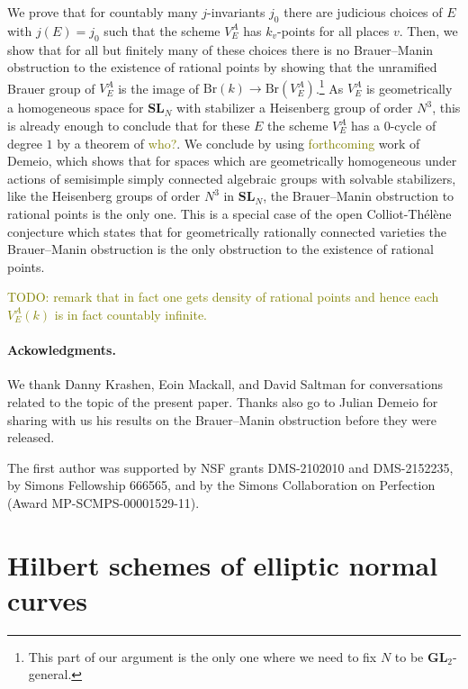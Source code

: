 \documentclass[10pt,letterpaper,twoside]{article}
\newcommand{\BA}[1]{\textcolor{olive}{#1}}
\renewcommand{\1}{\mathbf{1}}
\newcommand{\GL}{\mathbf{GL}}
\newcommand{\SL}{\mathbf{SL}}
\newcommand{\Br}{\mathrm{Br}}
\theoremstyle{plain}
\theoremstyle{plain}
\theoremstyle{definition}
\theoremstyle{named}
\theoremstyle{definition}
\begin{document}
	We prove that for countably many $j$-invariants $j_0$ there are judicious choices of $E$ with
	$j(E)=j_0$ such that the scheme $V_E^A$ has $k_v$-points for all places $v$. Then, we show that for
	all but finitely many of these choices there is no Brauer--Manin obstruction to the existence of
	rational points by showing that the unramified Brauer group of $V_E^A$ is the image
	of $\Br(k)\rightarrow\Br(V_E^A)$.\footnote{This part of our argument is the only one where we need
		to fix $N$ to be $\GL_2$-general.} As $V_E^A$ is geometrically a homogeneous space for $\SL_N$ with
	stabilizer a Heisenberg group of order $N^3$, this is already enough to conclude that for these $E$ the scheme $V_E^A$ has a
	$0$-cycle of degree $1$ by a theorem of \BA{who?}. We conclude by using \BA{forthcoming} work of Demeio,
	which shows that for spaces which are geometrically homogeneous under actions of semisimple simply
	connected algebraic groups with solvable stabilizers, like the Heisenberg groups of order $N^3$ in
	$\SL_N$, the Brauer--Manin obstruction to rational points is the only one.
	This is a special case of the open Colliot-Th\'el\`ene conjecture which states that for geometrically
	rationally connected varieties the Brauer--Manin obstruction is the only obstruction to the
	existence of rational points.
	
	\BA{TODO: remark that in fact one gets density of rational points and hence each $V_E^A(k)$ is in
		fact countably infinite.}
	
	
	
	\paragraph{Ackowledgments.}
	We thank Danny Krashen, Eoin Mackall, and David Saltman for conversations related to the topic of the
	present paper. Thanks also go to Julian Demeio for sharing with us his results on the Brauer--Manin
	obstruction before they were released.
	
	The first author was supported by NSF grants DMS-2102010 and DMS-2152235, by Simons Fellowship
	666565, and by the Simons Collaboration on Perfection (Award MP-SCMPS-00001529-11).
	
	
	
	
	
	\section{Hilbert schemes of elliptic normal curves}
	
\end{document}
